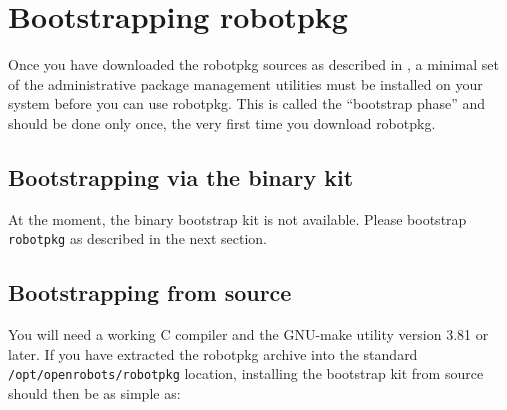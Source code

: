 %
%
%
%
%

\section{Bootstrapping robotpkg} %

Once    you    have downloaded  the     robotpkg    sources  as  described   in
, a   minimal  set of   the
administrative  package management utilities must   be installed on your system
before you can use robotpkg.  This is called the ``bootstrap phase'' and should
be done only once, the very first time you download robotpkg.


\subsection{Bootstrapping via the binary kit} %

At the moment, the binary bootstrap kit is not available. Please bootstrap {\tt
robotpkg} as described in the next section.


\subsection{Bootstrapping from source} %

You will  need a working C compiler  and the GNU-make   utility version 3.81 or
later.    If you have  extracted  the  robotpkg  archive  into  the standard {\tt
/opt/openrobots/robotpkg} location, installing the   bootstrap kit from  source
should then be as simple as:

